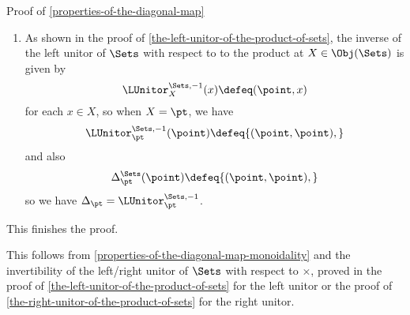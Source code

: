 \begin{Proof}{Proof of \cref{properties-of-the-diagonal-map}}
\begin{enumerate}
        \item\label{proof-of-properties-of-the-diagonal-map-monoidality-2}As shown in the proof of \cref{the-left-unitor-of-the-product-of-sets}, the inverse of the left unitor of $\Sets$ with respect to to the product at $X\in\Obj(\Sets)$ is given by
            \[
                \LUnitor^{\Sets,-1}_{X}(x)%
                \defeq%
                (\point,x)%
            \]%
            for each $x\in X$, so when $X=\pt$, we have
            \[
                \LUnitor^{\Sets,-1}_{\pt}(\point)%
                \defeq%
                {(\point,\point),}
            \]%
            and also
            \[
                \Delta^{\Sets}_{\pt}(\point)%
                \defeq%
                {(\point,\point),}
            \]%
            so we have $\Delta_{\pt}=\LUnitor^{\Sets,-1}_{\pt}$.
    \end{enumerate}
    This finishes the proof.

    This follows from \cref{properties-of-the-diagonal-map-monoidality} and the invertibility of the left/right unitor of $\Sets$ with respect to $\times$, proved in the proof of \cref{the-left-unitor-of-the-product-of-sets} for the left unitor or the proof of \cref{the-right-unitor-of-the-product-of-sets} for the right unitor.
\end{Proof}
